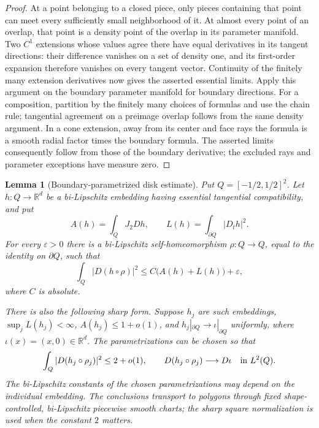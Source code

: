 \documentclass[11pt]{article}
\numberwithin{equation}{section}
\newtheorem{lemma}[theorem]{Lemma}
\theoremstyle{definition}
\theoremstyle{remark}
\newcommand{\R}{\mathbb R}
\newcommand{\eps}{\varepsilon}
\begin{document}
\begin{proof}
At a point belonging to a closed piece, only pieces containing that
point can meet every sufficiently small neighborhood of it.  At almost
every point of an overlap, that point is a density point of the overlap
in its parameter manifold.  Two $C^1$ extensions whose values agree
there have equal derivatives in its tangent directions: their difference
vanishes on a set of density one, and its first-order expansion therefore
vanishes on every tangent vector.  Continuity of the finitely many
extension derivatives now gives the asserted essential limits.
Apply this argument on the boundary parameter manifold for boundary
directions.  For a composition, partition by the finitely many choices
of formulas and use the chain rule; tangential agreement on a preimage
overlap follows from the same density argument.  In a cone extension,
away from its center and face rays the formula is a smooth radial
factor times the boundary formula.  The asserted limits consequently
follow from those of the boundary derivative; the excluded rays and
parameter exceptions have measure zero.
\end{proof}

\begin{lemma}[Boundary-parametrized disk estimate]
\label{lt:disk}
Put $Q=[-1/2,1/2]^2$.  Let $h:Q\to\R^d$ be a bi-Lipschitz embedding
having essential tangential compatibility, and put
\[
 A(h)=\int_Q J_2Dh,\qquad
 L(h)=\int_{\partial Q}|D_t h|^2.
\]
For every $\eps>0$ there is a bi-Lipschitz self-homeomorphism
$\rho:Q\to Q$, equal to the identity on $\partial Q$, such that
\begin{equation}
 \int_Q|D(h\circ\rho)|^2
       \leq C\bigl(A(h)+L(h)\bigr)+\eps,
 \label{lt:disk-weak}
\end{equation}
where $C$ is absolute.

There is also the following sharp form.  Suppose $h_j$ are such
embeddings, $\sup_jL(h_j)<\infty$,
$A(h_j)\leq1+o(1)$, and
$h_j|_{\partial Q}\to\iota|_{\partial Q}$ uniformly, where
$\iota(x)=(x,0)\in\R^d$.  The parametrizations can be chosen so that
\begin{equation}
 \int_Q|D(h_j\circ\rho_j)|^2\leq2+o(1),
 \qquad
 D(h_j\circ\rho_j)\longrightarrow D\iota
       \quad\hbox{in }L^2(Q).
 \label{lt:disk-sharp}
\end{equation}
The bi-Lipschitz constants of the chosen parametrizations may depend on
the individual embedding.  The conclusions transport to polygons
through fixed shape-controlled, bi-Lipschitz piecewise smooth charts;
the sharp square normalization is used when the constant $2$ matters.
\end{lemma}
\end{document}
